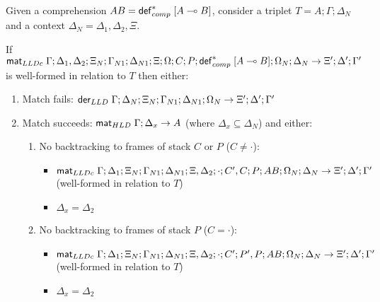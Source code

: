 {\footnotesize
\begin{lemma}\label{thm:comprehension_body_match}
Given a comprehension $AB = \mathsf{def}_{comp}^{*} \; [A \multimap B]$, consider a triplet $T = A; \Gamma; \Delta_{N}$ and a context $\Delta_{N} = \Delta_1, \Delta_2, \Xi$.

If $\mathsf{mat}_{LLDc} \; \Gamma; \Delta_1, \Delta_2; \Xi_N; \Gamma_{N1}; \Delta_{N1}; \Xi;
\Omega; C; P; \mathsf{def}_{comp}^{*} \; [A \multimap B]; \Omega_N; \Delta_N \rightarrow \Xi'; \Delta'; \Gamma'$ is well-formed in relation to $T$ then either:

   \begin{enumerate}
      \item Match fails: $\mathsf{der}_{LLD} \; \Gamma; \Delta_N; \Xi_N; \Gamma_{N1}; \Delta_{N1}; \Omega_N \rightarrow \Xi'; \Delta'; \Gamma'$
      
      \item Match succeeds: $\mathsf{mat}_{HLD} \; \Gamma; \Delta_x \rightarrow A$ (where
            $\Delta_x \subseteq \Delta_N$) and either:

      \begin{enumerate}
         \item No backtracking to frames of stack $C$ or $P$ ($C \neq \cdot$):

         \begin{itemize}
            \item $\mathsf{mat}_{LLDc} \; \Gamma; \Delta_1; \Xi_N; \Gamma_{N1}; \Delta_{N1}; \Xi,
               \Delta_2; \cdot; C', C; P; AB; \Omega_N; \Delta_N
               \rightarrow \Xi'; \Delta'; \Gamma'$ (well-formed in relation to
                     $T$)
            \item $\Delta_x = \Delta_2$
         \end{itemize}

         \item No backtracking to frames of stack $P$ ($C = \cdot$):

         \begin{itemize}
            \item $\mathsf{mat}_{LLDc} \; \Gamma; \Delta_1; \Xi_N; \Gamma_{N1}; \Delta_{N1}; \Xi,
               \Delta_2; \cdot; C'; P', P; AB; \Omega_N; \Delta_N
               \rightarrow \Xi'; \Delta'; \Gamma'$ (well-formed in relation to
                     $T$)
            \item $\Delta_x = \Delta_2$
         \end{itemize}
         

\end{enumerate}
\end{enumerate}
\end{lemma}}
